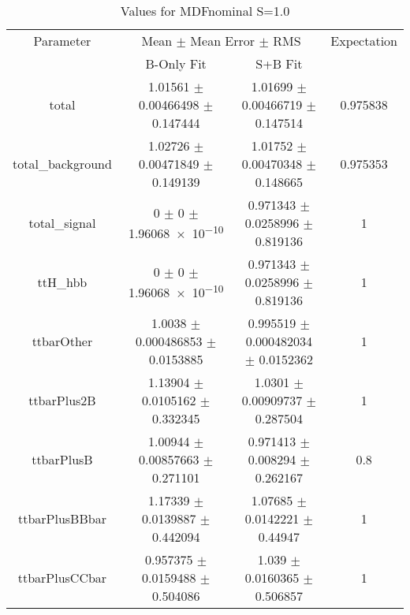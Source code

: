 \begin{table}
\centering
\caption{Values for MDFnominal S=1.0}
\begin{tabular}{cccc}
\toprule
Parameter & \multicolumn{2}{c}{Mean $\pm$ Mean Error $\pm$ RMS} & Expectation\\
 & B-Only Fit & S+B Fit & \\
\midrule
total & \num{1.01561} $\pm$ \num{0.00466498} $\pm$ \num{0.147444} & \num{1.01699} $\pm$ \num{0.00466719} $\pm$ \num{0.147514} & \num{0.975838}\\
total\_background & \num{1.02726} $\pm$ \num{0.00471849} $\pm$ \num{0.149139} & \num{1.01752} $\pm$ \num{0.00470348} $\pm$ \num{0.148665} & \num{0.975353}\\
total\_signal & \num{0} $\pm$ \num{0} $\pm$ \num{1.96068e-10} & \num{0.971343} $\pm$ \num{0.0258996} $\pm$ \num{0.819136} & \num{1}\\
ttH\_hbb & \num{0} $\pm$ \num{0} $\pm$ \num{1.96068e-10} & \num{0.971343} $\pm$ \num{0.0258996} $\pm$ \num{0.819136} & \num{1}\\
ttbarOther & \num{1.0038} $\pm$ \num{0.000486853} $\pm$ \num{0.0153885} & \num{0.995519} $\pm$ \num{0.000482034} $\pm$ \num{0.0152362} & \num{1}\\
ttbarPlus2B & \num{1.13904} $\pm$ \num{0.0105162} $\pm$ \num{0.332345} & \num{1.0301} $\pm$ \num{0.00909737} $\pm$ \num{0.287504} & \num{1}\\
ttbarPlusB & \num{1.00944} $\pm$ \num{0.00857663} $\pm$ \num{0.271101} & \num{0.971413} $\pm$ \num{0.008294} $\pm$ \num{0.262167} & \num{0.8}\\
ttbarPlusBBbar & \num{1.17339} $\pm$ \num{0.0139887} $\pm$ \num{0.442094} & \num{1.07685} $\pm$ \num{0.0142221} $\pm$ \num{0.44947} & \num{1}\\
ttbarPlusCCbar & \num{0.957375} $\pm$ \num{0.0159488} $\pm$ \num{0.504086} & \num{1.039} $\pm$ \num{0.0160365} $\pm$ \num{0.506857} & \num{1}\\
\bottomrule
\end{tabular}
\end{table}